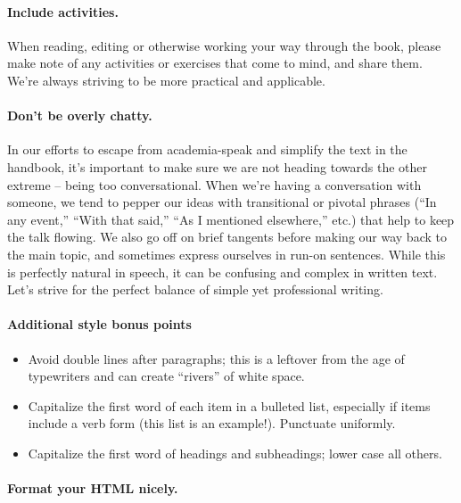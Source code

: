 \paragraph{Include activities.}

When reading, editing or otherwise working your way through the book,
please make note of any activities or exercises that come to mind, and
share them. We're always striving to be more practical and applicable.

\paragraph{Don't be overly chatty.}

In our efforts to escape from academia-speak and simplify the text in
the handbook, it's important to make sure we are not heading towards the
other extreme -- being too conversational. When we're having a
conversation with someone, we tend to pepper our ideas with transitional
or pivotal phrases (``In any event,'' ``With that said,'' ``As I
mentioned elsewhere,'' etc.) that help to keep the talk flowing. We also
go off on brief tangents before making our way back to the main topic,
and sometimes express ourselves in run-on sentences. While this is
perfectly natural in speech, it can be confusing and complex in written
text. Let's strive for the perfect balance of simple yet professional
writing.

\paragraph{Additional style bonus points}

\begin{itemize}
\item
  Avoid double lines after paragraphs; this is a leftover from the age
  of typewriters and can create ``rivers'' of white space.
\item
  Capitalize the first word of each item in a bulleted list, especially
  if items include a verb form (this list is an example!). Punctuate
  uniformly.
\item
  Capitalize the first word of headings and subheadings; lower case all
  others.
\end{itemize}

\paragraph{Format your HTML nicely.}

